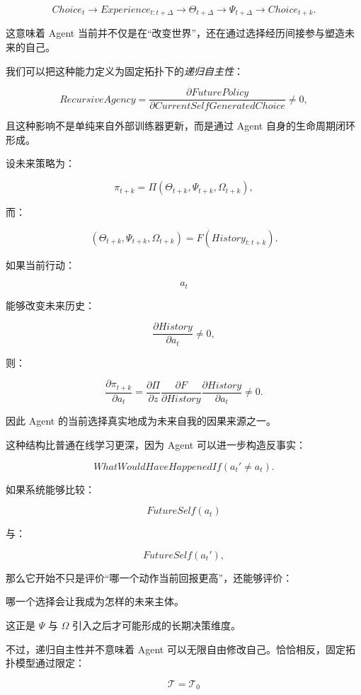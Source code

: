\[
Choice_t
\rightarrow
Experience_{t:t+\Delta}
\rightarrow
\Theta_{t+\Delta}
\rightarrow
\Psi_{t+\Delta}
\rightarrow
Choice_{t+k}.
\]

这意味着 Agent 当前并不仅是在“改变世界”，还在通过选择经历间接参与塑造未来的自己。

我们可以把这种能力定义为固定拓扑下的\emph{递归自主性}：

\[
\boxed{
RecursiveAgency
=
\frac{\partial FuturePolicy}
{\partial CurrentSelfGeneratedChoice}
\neq0,
}
\]

且这种影响不是单纯来自外部训练器更新，而是通过 Agent 自身的生命周期闭环形成。

设未来策略为：

\[
\pi_{t+k}
=
\Pi
(
\Theta_{t+k},
\Psi_{t+k},
\Omega_{t+k}
),
\]

而：

\[
(\Theta_{t+k},\Psi_{t+k},\Omega_{t+k})
=
F
(
History_{t:t+k}
).
\]

如果当前行动：

\[
a_t
\]

能够改变未来历史：

\[
\frac{\partial History}{\partial a_t}
\neq0,
\]

则：

\[
\frac{\partial \pi_{t+k}}
{\partial a_t}
=
\frac{\partial \Pi}{\partial z}
\frac{\partial F}{\partial History}
\frac{\partial History}{\partial a_t}
\neq0.
\]

因此 Agent 的当前选择真实地成为未来自我的因果来源之一。

这种结构比普通在线学习更深，因为 Agent 可以进一步构造反事实：

\[
WhatWouldHaveHappenedIf
(
a_t'
\neq
a_t
).
\]

如果系统能够比较：

\[
FutureSelf(a_t)
\]

与：

\[
FutureSelf(a_t'),
\]

那么它开始不只是评价“哪一个动作当前回报更高”，还能够评价：

\begin{statementbox}
哪一个选择会让我成为怎样的未来主体。
\end{statementbox}

这正是 $\Psi$ 与 $\Omega$ 引入之后才可能形成的长期决策维度。

不过，递归自主性并不意味着 Agent 可以无限自由修改自己。恰恰相反，固定拓扑模型通过限定：

\[
\mathcal{T}=\mathcal{T}_0
\]

